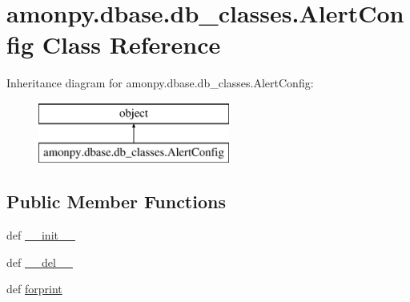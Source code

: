 \hypertarget{classamonpy_1_1dbase_1_1db__classes_1_1_alert_config}{\section{amonpy.\-dbase.\-db\-\_\-classes.\-Alert\-Config Class Reference}
\label{classamonpy_1_1dbase_1_1db__classes_1_1_alert_config}
}
Inheritance diagram for amonpy.\-dbase.\-db\-\_\-classes.\-Alert\-Config\-:\begin{figure}[H]
\begin{center}
\leavevmode
\includegraphics[height=2.000000cm]{classamonpy_1_1dbase_1_1db__classes_1_1_alert_config}
\end{center}
\end{figure}
\subsection*{Public Member Functions}
\begin{DoxyCompactItemize}
\item 
def \hyperlink{classamonpy_1_1dbase_1_1db__classes_1_1_alert_config_ac579b972a4ff6bbd4770a04df3bcb744}{\-\_\-\-\_\-init\-\_\-\-\_\-}
\item 
def \hyperlink{classamonpy_1_1dbase_1_1db__classes_1_1_alert_config_a0b505c28e0b2083d929998465a3d205c}{\-\_\-\-\_\-del\-\_\-\-\_\-}
\item 
def \hyperlink{classamonpy_1_1dbase_1_1db__classes_1_1_alert_config_a4199bb054162725442056137dac9c760}{forprint}
\end{DoxyCompactItemize}
